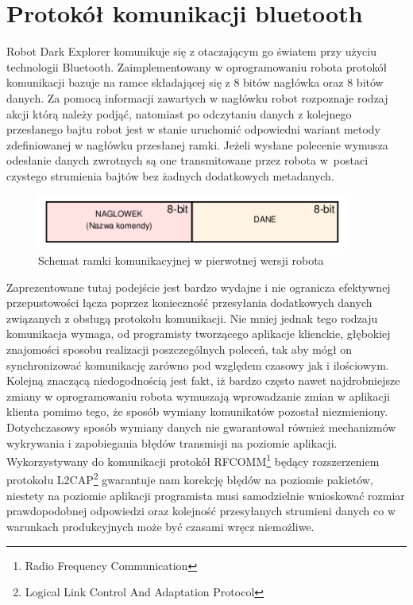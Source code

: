 \section{Protokół komunikacji bluetooth}
Robot Dark Explorer komunikuje się z otaczającym go światem przy użyciu
technologii Bluetooth. Zaimplementowany w oprogramowaniu robota protokół
komunikacji bazuje na ramce składającej się z 8 bitów nagłówka oraz 8 bitów
danych. Za pomocą informacji zawartych w nagłówku robot rozpoznaje
rodzaj akcji którą należy podjąć, natomiast po odczytaniu danych z kolejnego
przesłanego bajtu robot jest w stanie uruchomić odpowiedni wariant metody
zdefiniowanej w nagłówku przesłanej ramki. Jeżeli wysłane polecenie wymusza
odesłanie danych zwrotnych są one transmitowane przez robota w~postaci czystego
strumienia bajtów bez żadnych dodatkowych metadanych. 

\begin{figure}[h!]
 \centering
 \includegraphics[height=18mm]{../images/ch05/old_req_schema.png}
 \caption{Schemat ramki komunikacyjnej w pierwotnej wersji robota}
 \label{fig:OldCommFrame}
\end{figure}

Zaprezentowane tutaj podejście jest bardzo wydajne i nie ogranicza efektywnej
przepustowości łącza poprzez konieczność przesyłania dodatkowych danych
związanych z obsługą protokołu komunikacji. Nie mniej jednak tego rodzaju
komunikacja wymaga, od programisty tworzącego aplikacje klienckie, głębokiej
znajomości sposobu realizacji poszczególnych poleceń, tak aby mógł on
synchronizować komunikację zarówno pod względem czasowy jak i ilościowym. Kolejną
znaczącą niedogodnością jest fakt, iż bardzo często nawet najdrobniejsze zmiany
w oprogramowaniu robota wymuszają wprowadzanie zmian w aplikacji klienta pomimo
tego, że sposób wymiany komunikatów pozostał niezmieniony. Dotychczasowy sposób
wymiany danych nie gwarantował również mechanizmów wykrywania i zapobiegania
błędów transmisji na poziomie aplikacji. Wykorzystywany do komunikacji protokół
RFCOMM\footnote{Radio Frequency Communication} będący rozszerzeniem protokołu
L2CAP\footnote{Logical Link Control And Adaptation Protocol} gwarantuje nam
korekcję błędów na poziomie pakietów, niestety na poziomie aplikacji programista
musi samodzielnie wnioskować rozmiar prawdopodobnej odpowiedzi oraz kolejność
przesyłanych strumieni danych co w warunkach produkcyjnych może być czasami
wręcz niemożliwe.

